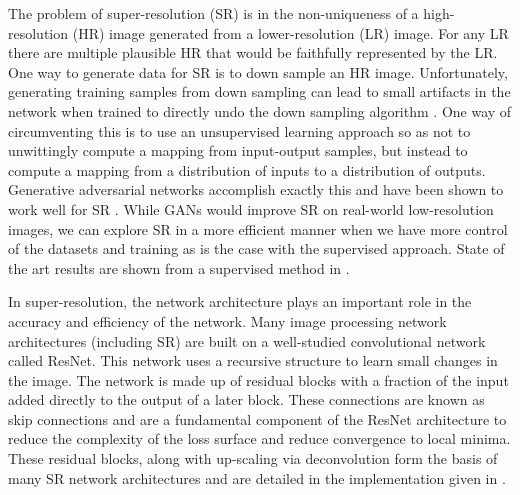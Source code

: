 \documentclass{article}
\begin{document}
The problem of super-resolution (SR) is in the non-uniqueness of a high-resolution (HR) image generated from a lower-resolution (LR) image. For any LR there are multiple plausible HR that would be faithfully represented by the LR. One way to generate data for SR is to down sample an HR image. Unfortunately, generating training samples from down sampling can lead to small artifacts in the network when trained to directly undo the down sampling algorithm \cite{yang2019deep}. One way of circumventing this is to use an unsupervised learning approach so as not to unwittingly compute a mapping from input-output samples, but instead to compute a mapping from a distribution of inputs to a distribution of outputs. Generative adversarial networks accomplish exactly this and have been shown to work well for SR \cite{ledig2017photo}. While GANs would improve SR on real-world low-resolution images, we can explore SR in a more efficient manner when we have more control of the datasets and training as is the case with the supervised approach. State of the art results are shown from a supervised method in \cite{lim2017enhanced}.

In super-resolution, the network architecture plays an important role in the accuracy and efficiency of the network. Many image processing network architectures (including SR) are built on a well-studied convolutional network called ResNet. This network uses a recursive structure to learn small changes in the image. The network is made up of residual blocks with a fraction of the input added directly to the output of a later  block. These connections are known as skip connections and are a fundamental component of the ResNet architecture \cite{he2016deep} to reduce the complexity of the loss surface and reduce convergence to local minima. These residual blocks, along with up-scaling via deconvolution form the basis of many SR network architectures \cite{yang2019deep} and are detailed in the implementation given in \cite{lim2017enhanced}.
\end{document}
